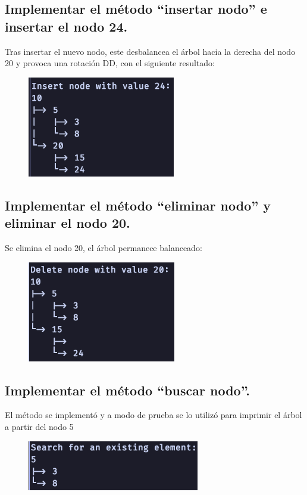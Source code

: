 \documentclass[a4paper,notitlepage]{article}
\begin{document}
\subsection{Implementar el método “insertar nodo” e insertar el nodo 24.}
Tras insertar el nuevo nodo, este desbalancea el árbol hacia la derecha del nodo
20 y provoca una rotación DD, con el siguiente resultado:

\begin{figure}[H]
    \centering
    \includegraphics[scale=0.65]{imgs/insert-node.png}
\end{figure}

\pagebreak

\subsection{Implementar el método “eliminar nodo” y eliminar el nodo 20.}
Se elimina el nodo 20, el árbol permanece balanceado:

\begin{figure}[H]
    \centering
    \includegraphics[scale=0.65]{imgs/delete-node.png}
\end{figure}

\subsection{Implementar el método “buscar nodo”.}
El método se implementó y a modo de prueba se lo utilizó para imprimir el árbol
a partir del nodo 5

\begin{figure}[H]
    \centering
    \includegraphics[scale=0.65]{imgs/search.png}
\end{figure}
\end{document}
